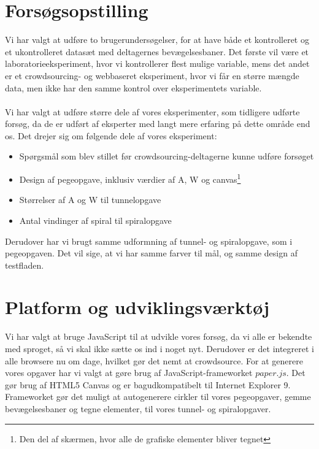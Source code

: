\section*{Forsøgsopstilling}
Vi har valgt at udføre to brugerundersøgelser, for at have både et kontrolleret og et ukontrolleret datasæt med deltagernes bevægelsesbaner.
Det første vil være et laboratorieeksperiment, hvor vi kontrollerer flest mulige variable, mens det andet er et crowdsourcing- og webbaseret eksperiment, hvor vi får en større mængde data, men ikke har den samme kontrol over eksperimentets variable.\\\\
Vi har valgt at udføre større dele af vores eksperimenter, som tidligere udførte forsøg, da de er udført af eksperter med langt mere erfaring på dette område end os.
Det drejer sig om følgende dele af vores eksperiment:
\begin{itemize}
\item Spørgsmål som blev stillet før crowdsourcing-deltagerne kunne udføre forsøget \cite{goldberg2015}
\item Design af pegeopgave, inklusiv værdier af A, W og canvas\footnote{Den del af skærmen, hvor alle de grafiske elementer bliver tegnet} \cite{goldberg2015}
\item Størrelser af A og W til tunnelopgave \cite{accot1997}
\item Antal vindinger af spiral til spiralopgave \cite{accot1997}
\end{itemize}
Derudover har vi brugt samme udformning af tunnel- og spiralopgave, som i pegeopgaven. Det vil sige, at vi har samme farver til mål, og samme design af testfladen.

\section*{Platform og udviklingsværktøj}
Vi har valgt at bruge JavaScript til at udvikle vores forsøg, da vi alle er bekendte med sproget, så vi skal ikke sætte os ind i noget nyt. Derudover er det integreret i alle browsere nu om dage, hvilket gør det nemt at crowdsource. For at generere vores opgaver har vi valgt at gøre brug af JavaScript-frameworket $paper.js$. Det gør brug af HTML5 Canvas og er bagudkompatibelt til Internet Explorer 9. Frameworket gør det muligt at autogenerere cirkler til vores pegeopgaver, gemme bevægelsesbaner og tegne elementer, til vores tunnel- og spiralopgaver.

